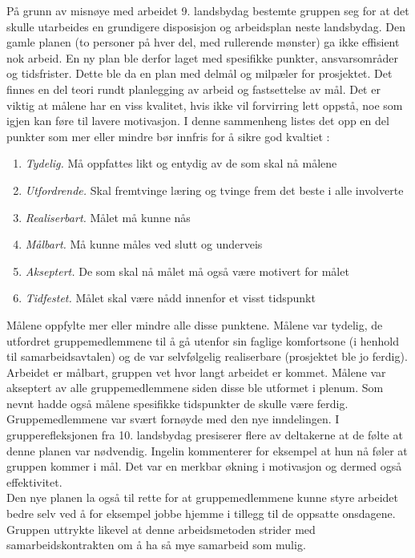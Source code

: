 På grunn av misnøye med arbeidet 9. landsbydag bestemte gruppen seg for at det skulle utarbeides en grundigere disposisjon og arbeidsplan neste landsbydag.
Den gamle planen (to personer på hver del, med rullerende mønster) ga ikke effisient nok arbeid.
En ny plan ble derfor laget med spesifikke punkter, ansvarsområder og tidsfrister.
Dette ble da en plan med delmål og milpæler for prosjektet.
Det finnes en del teori rundt planlegging av arbeid og fastsettelse av mål.
Det er viktig at målene har en viss kvalitet, hvis ikke vil forvirring lett oppstå, noe som igjen kan føre til lavere motivasjon.
I denne sammenheng listes det opp en del punkter som mer eller mindre bør innfris for å sikre god kvaltiet \cite{prosjekteringsledelse}:
\begin{enumerate}
\item \textit{Tydelig.} Må oppfattes likt og entydig av de som skal nå målene
\item \textit{Utfordrende.} Skal fremtvinge læring og tvinge frem det beste i alle involverte
\item \textit{Realiserbart.} Målet må kunne nås
\item \textit{Målbart.} Må kunne måles ved slutt og underveis
\item \textit{Akseptert.} De som skal nå målet må også være motivert for målet
\item \textit{Tidfestet.} Målet skal være nådd innenfor et visst tidspunkt
\end{enumerate}
Målene oppfylte mer eller mindre alle disse punktene.
Målene var tydelig, de utfordret gruppemedlemmene til å gå utenfor sin faglige komfortsone (i henhold til samarbeidsavtalen) og de var selvfølgelig realiserbare (prosjektet ble jo ferdig).
Arbeidet er målbart, gruppen vet hvor langt arbeidet er kommet.
Målene var akseptert av alle gruppemedlemmene siden disse ble utformet i plenum.
Som nevnt hadde også målene spesifikke tidspunkter de skulle være ferdig. 
\\
Gruppemedlemmene var svært fornøyde med den nye inndelingen.
I grupperefleksjonen fra 10. landsbydag presiserer flere av deltakerne at de følte at denne planen var nødvendig.
Ingelin kommenterer for eksempel at hun nå føler at gruppen kommer i mål.
Det var en merkbar økning i motivasjon og dermed også effektivitet.
\\
Den nye planen la også til rette for at gruppemedlemmene kunne styre arbeidet bedre selv ved å for eksempel jobbe hjemme i tillegg til de oppsatte onsdagene.
Gruppen uttrykte likevel at denne arbeidsmetoden strider med samarbeidskontrakten om å ha så mye samarbeid som mulig.
